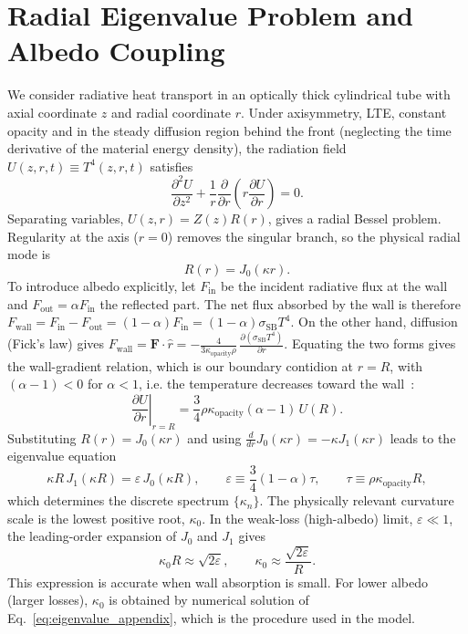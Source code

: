 \documentclass[11pt]{article}
\begin{document}
\section{Radial Eigenvalue Problem and Albedo Coupling}
We consider radiative heat transport in an optically thick cylindrical tube with axial coordinate $z$ and radial coordinate $r$. Under axisymmetry, LTE, constant opacity and in the steady diffusion region behind the front (neglecting the time derivative of the material energy density), the radiation field $U(z,r,t)\equiv T^4(z,r,t)$ satisfies~\cite{Hurricane2006,Courtois2022}
\begin{equation}
\frac{\partial^2 U}{\partial z^2}
+
\frac{1}{r}\frac{\partial}{\partial r}\left(r\frac{\partial U}{\partial r}\right)=0.
\label{eq:laplace_appendix}
\end{equation}
Separating variables, $U(z,r)=Z(z)R(r)$, gives a radial Bessel problem. Regularity at the axis ($r=0$) removes the singular branch, so the physical radial mode is~\cite{Hurricane2006}
\begin{equation}
R(r)=J_0(\kappa r).
\label{eq:radial_mode_appendix}
\end{equation}
To introduce albedo explicitly, let $F_{\mathrm{in}}$ be the incident radiative flux at the wall and $F_{\mathrm{out}}=\alpha F_{\mathrm{in}}$ the reflected part. The net flux absorbed by the wall is therefore $F_{\mathrm{wall}}=F_{\mathrm{in}}-F_{\mathrm{out}}=(1-\alpha)F_{\mathrm{in}}=(1-\alpha)\sigma_{\mathrm{SB}}T^4$. On the other hand, diffusion (Fick's law) gives $F_{\mathrm{wall}}=\mathbf{F}\cdot\hat{r}=-\frac{4}{3\kappa_{\mathrm{opacity}}\rho}\,\frac{\partial(\sigma_{\mathrm{SB}}T^4)}{\partial r}$. Equating the two forms gives the wall-gradient relation, which is our boundary contidion at $r=R$, with $(\alpha-1)<0$ for $\alpha<1$, i.e. the temperature decreases toward the wall~\cite{Hurricane2006,Courtois2022}:
\begin{equation}
\left.\frac{\partial U}{\partial r}\right|_{r=R}
=
\frac{3}{4}\rho\kappa_{\mathrm{opacity}}(\alpha-1)\,U(R).
\label{eq:robin_appendix}
\end{equation}
Substituting $R(r)=J_0(\kappa r)$ and using $\frac{d}{dr}J_0(\kappa r)=-\kappa J_1(\kappa r)$ leads to the eigenvalue equation~\cite{Hurricane2006,Courtois2022}
\begin{equation}
\kappa R\,J_1(\kappa R)=\varepsilon\,J_0(\kappa R),
\qquad
\varepsilon\equiv\frac{3}{4}(1-\alpha)\tau,
\qquad
\tau\equiv\rho\kappa_{\mathrm{opacity}}R,
\label{eq:eigenvalue_appendix}
\end{equation}
which determines the discrete spectrum $\{\kappa_n\}$. The physically relevant curvature scale is the lowest positive root, $\kappa_0$. In the weak-loss (high-albedo) limit, $\varepsilon\ll1$, the leading-order expansion of $J_0$ and $J_1$ gives
\begin{equation}
\kappa_0R\approx\sqrt{2\varepsilon},
\qquad
\kappa_0\approx\frac{\sqrt{2\varepsilon}}{R}.
\label{eq:kappa0_small_loss_appendix}
\end{equation}
This expression is accurate when wall absorption is small. For lower albedo (larger losses), $\kappa_0$ is obtained by numerical solution of Eq.~\eqref{eq:eigenvalue_appendix}, which is the procedure used in the model.
\end{document}
